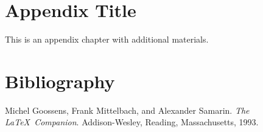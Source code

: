 \documentclass[12pt, letterpaper]{book}
\begin{document}
\appendix
\chapter{Appendix Title}
This is an appendix chapter with additional materials.

\backmatter
\chapter{Bibliography}

\begin{thebibliography}{9}
Michel Goossens, Frank Mittelbach, and Alexander Samarin. 
\textit{The \LaTeX\ Companion}. 
Addison-Wesley, Reading, Massachusetts, 1993.
\end{thebibliography}
\end{document}
